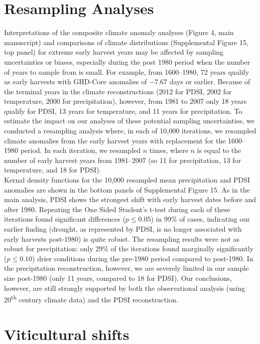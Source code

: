 \documentclass[12pt]{article}
\begin{document}
\section*{Resampling Analyses}
\noindent Interpretations of the composite climate anomaly analyses (Figure 4, main manuscript) and comparisons of climate distributions (Supplemental Figure 15, top panel) for extreme early harvest years may be affected by sampling uncertainties or biases, especially during the post 1980 period when the number of years to sample from is small. For example, from 1600--1980, 72 years qualify as early harvests with GHD-Core anomalies of $-7.67$ days or earlier. Because of the terminal years in the climate reconstructions (2012 for PDSI, 2002 for temperature, 2000 for precipitation), however, from 1981 to 2007 only 18 years qualify for PDSI, 13 years for temperature, and 11 years for precipitation. To estimate the impact on our analyses of these potential sampling uncertainties, we conducted a resampling analysis where, in each of 10,000 iterations, we resampled climate anomalies from the early harvest years with replacement for the 1600--1980 period. In each iteration, we resampled $n$ times, where $n$ is equal to the number of early harvest years from 1981--2007 (so 11 for precipitation, 13 for temperature, and 18 for PDSI).\\
\indent Kernal density functions for the 10,000 resampled mean precipitation and PDSI anomalies are shown in the bottom panels of Supplemental Figure 15. As in the main analysis, PDSI shows the strongest shift with early harvest dates before and after 1980. Repeating the One Sided Student's t-test during each of these iterations found significant differences ($p\le0.05$) in 99\% of cases, indicating our earlier finding (drought, as represented by PDSI, is no longer associated with early harvests post-1980) is quite robust. The resampling results were not as robust for precipitation: only 29\% of the iterations found marginally significantly ($p\le0.10$) drier conditions during the pre-1980 period compared to post-1980. In the precipitation reconstruction, however, we are severely limited in our sample size post-1980 (only 11 years, compared to 18 for PDSI). Our conclusions, however, are still strongly supported by both the observational analysis (using 20\textsuperscript{th} century climate data) and the PDSI reconstruction.

\section*{Viticultural shifts}
\end{document}

